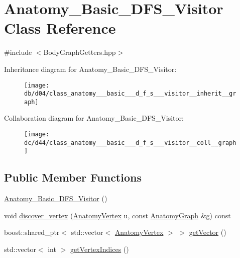\hypertarget{class_anatomy___basic___d_f_s___visitor}{}\section{Anatomy\+\_\+\+Basic\+\_\+\+D\+F\+S\+\_\+\+Visitor Class Reference}
\label{class_anatomy___basic___d_f_s___visitor}


{\ttfamily \#include $<$Body\+Graph\+Getters.\+hpp$>$}



Inheritance diagram for Anatomy\+\_\+\+Basic\+\_\+\+D\+F\+S\+\_\+\+Visitor\+:\nopagebreak
\begin{figure}[H]
\begin{center}
\leavevmode
\texttt{[image: db/d04/class\_anatomy\_\_\_basic\_\_\_d\_f\_s\_\_\_visitor\_\_inherit\_\_graph]}
\end{center}
\end{figure}


Collaboration diagram for Anatomy\+\_\+\+Basic\+\_\+\+D\+F\+S\+\_\+\+Visitor\+:\nopagebreak
\begin{figure}[H]
\begin{center}
\leavevmode
\texttt{[image: dc/d44/class\_anatomy\_\_\_basic\_\_\_d\_f\_s\_\_\_visitor\_\_coll\_\_graph]}
\end{center}
\end{figure}
\subsection*{Public Member Functions}
\begin{DoxyCompactItemize}
\item 
\mbox{\hyperlink{class_anatomy___basic___d_f_s___visitor_ac0bad4df0cee8032fac56785830651b6}{Anatomy\+\_\+\+Basic\+\_\+\+D\+F\+S\+\_\+\+Visitor}} ()
\item 
void \mbox{\hyperlink{class_anatomy___basic___d_f_s___visitor_a718b8e46e3b31e6b046cc20dc1400054}{discover\+\_\+vertex}} (\mbox{\hyperlink{_body_graph_8hpp_aeb92fc7b3eed88cf25a4fc7b708a66cf}{Anatomy\+Vertex}} u, const \mbox{\hyperlink{_body_graph_8hpp_ab01b157c2e143191570b012d275fbf0d}{Anatomy\+Graph}} \&g) const
\item 
boost\+::shared\+\_\+ptr$<$ std\+::vector$<$ \mbox{\hyperlink{_body_graph_8hpp_aeb92fc7b3eed88cf25a4fc7b708a66cf}{Anatomy\+Vertex}} $>$ $>$ \mbox{\hyperlink{class_anatomy___basic___d_f_s___visitor_ad8e84fa450c5fb86f92d66adbeed782e}{get\+Vector}} ()
\item 
std\+::vector$<$ int $>$ \mbox{\hyperlink{class_anatomy___basic___d_f_s___visitor_aa4d4a9a684cd4ab15c965d3044530b76}{get\+Vertex\+Indices}} ()
\end{DoxyCompactItemize}
